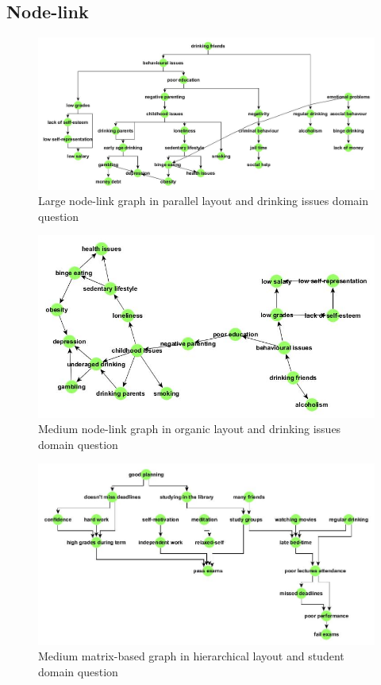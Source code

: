 \documentclass{l4proj}
\begin{document}
\begin{appendices}
\subsection{Node-link}

\begin{figure}
\centering
\includegraphics[width=20cm]{images/drinkingIssuesLargeParallel.jpg}
\caption{Large node-link graph in parallel layout and drinking issues domain question}
\label{drinkingIssuesLargeParallel}
\end{figure}

\begin{figure}
\centering
\includegraphics[width=20cm]{images/drinkingIssuesMedOrganic.jpg}
\caption{Medium node-link graph in organic layout and drinking issues domain question}
\label{drinkingIssuesMedOrganic}
\end{figure}


\begin{figure}
\centering
\includegraphics[width=20cm]{images/studentMedHier.jpg}
\caption{Medium matrix-based graph in hierarchical layout and student domain question}
\label{studentMedHier}
\end{figure}



\end{appendices}
\end{document}
